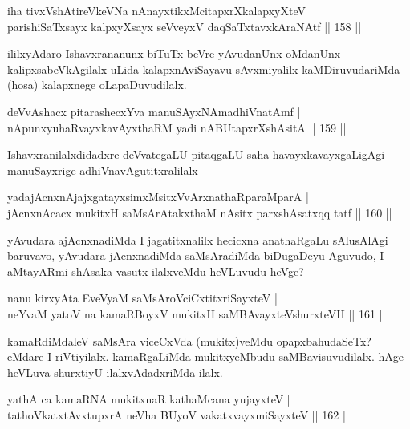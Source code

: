 \begin{shl}
iha tivxVshAtireVkeVNa nAnayxtikxMcitapxrXkalapxyXteV |\\
parishiSaTxsayx kalpxyXsayx seVveyxV daqSaTxtavxkAraNAtf \hfill || 158 ||
\end{shl}

\begin{artha}
ililxyAdaro Ishavxrananunx biTuTx beVre yAvudanUnx oMdanUnx kalipxsabeVkAgilalx uLida kalapxnAviSayavu sAvxmiyalilx kaMDiruvudariMda (hosa) kalapxnege oLapaDuvudilalx.
\end{artha}

\begin{shl}
deVvAshacx pitarashecxYva manuSAyxNAmadhiVnatAmf |\\
nA\s \s punxyuhaRvayxkavAyxthaRM yadi nABUtapxrXshAsitA \hfill || 159 ||
\end{shl}

\begin{artha}
Ishavxranilalxdidadxre deVvategaLU pitaqgaLU saha havayxkavayxgaLigAgi manuSayxrige adhiVnavAgutitxralilalx
\end{artha}

\begin{shl}
yadajAcnxnAjajxgatayxsimxMsitxVvArxnathaRparaMparA |\\
jAcnxnAcacx mukitxH saMsArAtakxthaM nAsitx parxshAsatxqq tatf \hfill || 160 ||
\end{shl}

\begin{artha}
yAvudara ajAcnxnadiMda I jagatitxnalilx hecicxna anathaRgaLu sAlusAlAgi baruvavo, yAvudara jAcnxnadiMda saMsAradiMda biDugaDeyu Aguvudo, I aMtayARmi shAsaka vasutx ilalxveMdu heVLuvudu heVge?
\end{artha}


\begin{shl}
nanu kirxyAta EveVyaM saMsAroVciCxtitxriSayxteV |\\
neYvaM yatoV na kamaRBoyxV mukitxH saMBAvayxteV\s shurxteVH \hfill || 161 ||
\end{shl}

\begin{artha}
kamaRdiMdaleV saMsAra viceCxVda (mukitx)veMdu opapxbahudaSeTx? eMdare-I riVtiyilalx. kamaRgaLiMda mukitxyeMbudu saMBavisuvudilalx. hAge heVLuva shurxtiyU ilalxvAdadxriMda ilalx.
\end{artha}

\begin{shl}
yathA ca kamaRNA mukitxnaR kathaMcana yujayxteV |\\
tathoVkatxtAvxtupxrA neVha BUyoV vakatxvayxmiSayxteV \hfill || 162 ||
\end{shl}

